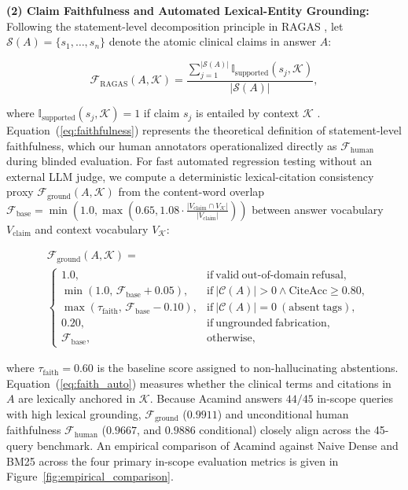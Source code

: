 \documentclass[10pt]{SPIIRAS_Proceedings}
\begin{document}
\textbf{(2) Claim Faithfulness and Automated Lexical-Entity Grounding:} Following the statement-level decomposition principle in RAGAS \cite{es2024ragas}, let $\mathcal{S}(A) = \{s_1, \dots, s_n\}$ denote the atomic clinical claims in answer $A$:

\begin{equation}
\mathcal{F}_{\mathrm{RAGAS}}(A, \mathcal{K}) = \frac{\sum_{j=1}^{|\mathcal{S}(A)|} \mathbb{I}_{\mathrm{supported}}(s_j, \mathcal{K})}{|\mathcal{S}(A)|},
\label{eq:faithfulness}
\end{equation}

\noindent where $\mathbb{I}_{\mathrm{supported}}(s_j, \mathcal{K}) = 1$ if claim $s_j$ is entailed by context $\mathcal{K}$ \cite{es2024ragas}. Equation~(\ref{eq:faithfulness}) represents the theoretical definition of statement-level faithfulness, which our human annotators operationalized directly as $\mathcal{F}_{\mathrm{human}}$ during blinded evaluation. For fast automated regression testing without an external LLM judge, we compute a deterministic lexical-citation consistency proxy $\mathcal{F}_{\mathrm{ground}}(A, \mathcal{K})$ from the content-word overlap $\mathcal{F}_{\mathrm{base}} = \min\left(1.0, \max\left(0.65, 1.08 \cdot \frac{|V_{\mathrm{claim}} \cap V_{\mathcal{K}}|}{|V_{\mathrm{claim}}|}\right)\right)$ between answer vocabulary $V_{\mathrm{claim}}$ and context vocabulary $V_{\mathcal{K}}$:

\begin{equation}
\begin{aligned}
&\mathcal{F}_{\mathrm{ground}}(A, \mathcal{K}) =\\
&\begin{cases}
1.0, & \mathrm{if\ valid\ out\text{-}of\text{-}domain\ refusal}, \\[4pt]
\min(1.0, \, \mathcal{F}_{\mathrm{base}} + 0.05), & \mathrm{if}\ |\mathcal{C}(A)| > 0 \land \mathrm{CiteAcc} \ge 0.80, \\[4pt]
\max(\tau_{\mathrm{faith}}, \, \mathcal{F}_{\mathrm{base}} - 0.10), & \mathrm{if}\ |\mathcal{C}(A)| = 0\ \mathrm{(absent\ tags)}, \\[4pt]
0.20, & \mathrm{if\ ungrounded\ fabrication}, \\[4pt]
\mathcal{F}_{\mathrm{base}}, & \mathrm{otherwise},
\end{cases}
\end{aligned}
\label{eq:faith_auto}
\end{equation}

\noindent where $\tau_{\mathrm{faith}} = 0.60$ is the baseline score assigned to non-hallucinating abstentions. Equation~(\ref{eq:faith_auto}) measures whether the clinical terms and citations in $A$ are lexically anchored in $\mathcal{K}$. Because Acamind answers $44/45$ in-scope queries with high lexical grounding, $\mathcal{F}_{\mathrm{ground}}$ ($0.9911$) and unconditional human faithfulness $\mathcal{F}_{\mathrm{human}}$ ($0.9667$, and $0.9886$ conditional) closely align across the 45-query benchmark. An empirical comparison of Acamind against Naive Dense and BM25 across the four primary in-scope evaluation metrics is given in Figure~\ref{fig:empirical_comparison}.
\end{document}
